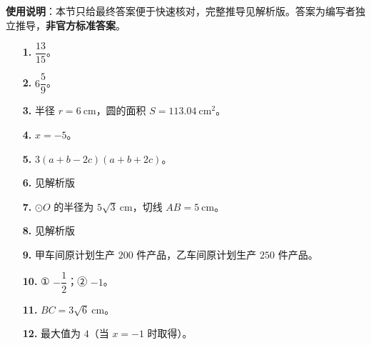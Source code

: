 
\begin{gknotice}
\textbf{使用说明}：本节只给最终答案便于快速核对，完整推导见解析版。答案为编写者独立推导，\textbf{非官方标准答案}。
\end{gknotice}

\begin{itemize}[leftmargin=2.6em]
  \item[\textbf{1.}] $\dfrac{13}{15}$。
  \item[\textbf{2.}] $6\dfrac59$。
  \item[\textbf{3.}] 半径 $r=6\ \mathrm{cm}$，圆的面积 $S=113.04\ \mathrm{cm^2}$。
  \item[\textbf{4.}] $x=-5$。
  \item[\textbf{5.}] $3(a+b-2c)(a+b+2c)$。
  \item[\textbf{6.}] 见解析版
  \item[\textbf{7.}] $\odot O$ 的半径为 $5\sqrt3\ \mathrm{cm}$，切线 $AB=5\ \mathrm{cm}$。
  \item[\textbf{8.}] 见解析版
  \item[\textbf{9.}] 甲车间原计划生产 $200$ 件产品，乙车间原计划生产 $250$ 件产品。
  \item[\textbf{10.}] ① $-\dfrac12$；② $-1$。
  \item[\textbf{11.}] $BC=3\sqrt6\ \mathrm{cm}$。
  \item[\textbf{12.}] 最大值为 $4$（当 $x=-1$ 时取得）。
\end{itemize}
